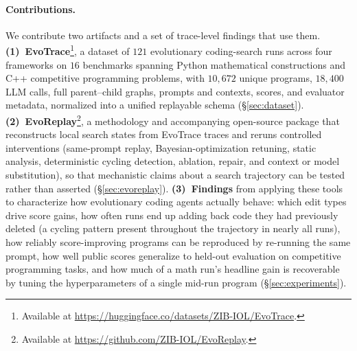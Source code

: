 \paragraph{Contributions.}
We contribute two artifacts and a set of trace-level findings that use them.
\textbf{(1)~EvoTrace}\footnote{Available at \url{https://huggingface.co/datasets/ZIB-IOL/EvoTrace}.}, a dataset of $121$ evolutionary coding-search runs across four frameworks on $16$ benchmarks spanning Python mathematical constructions and C++ competitive programming problems, with $10{,}672$ unique programs, $18{,}400$ LLM calls, full parent--child graphs, prompts and contexts, scores, and evaluator metadata, normalized into a unified replayable schema (\S\ref{sec:dataset}).
\textbf{(2)~EvoReplay}\footnote{Available at \url{https://github.com/ZIB-IOL/EvoReplay}.}, a methodology and accompanying open-source package that reconstructs local search states from EvoTrace traces and reruns controlled interventions (same-prompt replay, Bayesian-optimization retuning, static analysis, deterministic cycling detection, ablation, repair, and context or model substitution), so that mechanistic claims about a search trajectory can be tested rather than asserted (\S\ref{sec:evoreplay}).
\textbf{(3)~Findings} from applying these tools to characterize how evolutionary coding agents actually behave: which edit types drive score gains, how often runs end up adding back code they had previously deleted (a cycling pattern present throughout the trajectory in nearly all runs), how reliably score-improving programs can be reproduced by re-running the same prompt, how well public scores generalize to held-out evaluation on competitive programming tasks, and how much of a math run's headline gain is recoverable by tuning the hyperparameters of a single mid-run program (\S\ref{sec:experiments}).
